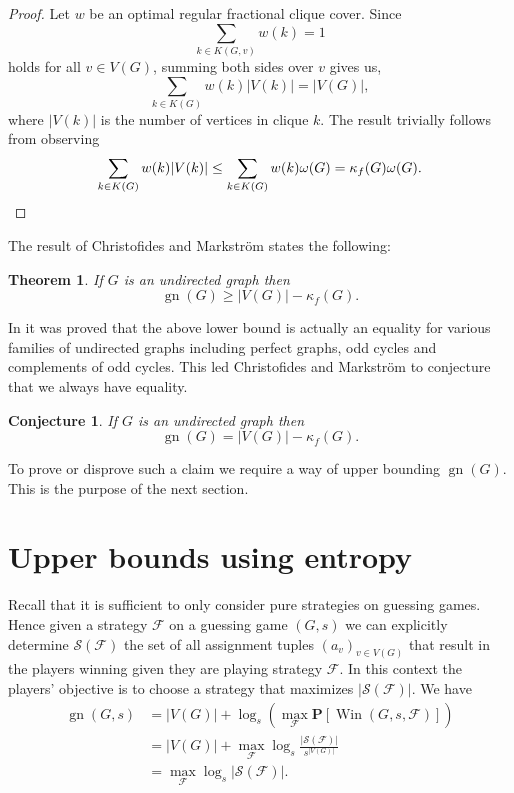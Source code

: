 \documentclass[a4paper, 14pt]{extarticle}
\theoremstyle{plain}
\newtheorem{theorem}[proposition]{Theorem}
\newtheorem{conjecture}[proposition]{Conjecture}
\def\mc{\mathcal}
\def\mb{\mathbf}
\DeclareMathOperator{\gn}{gn}
\DeclareMathOperator{\Win}{Win}
\begin{document}
\begin{proof}
Let $w$ be an optimal regular fractional clique cover. Since
\[\sum_{k\in K(G,v)} w(k) = 1\] 
holds for all $v\in V(G)$, summing
both sides over $v$ gives us,
\[
\sum_{k\in K(G)} w(k)|V(k)| = |V(G)|,
\]
where $|V(k)|$ is the number of vertices in clique $k$. The result
trivially follows from observing
\[
\sum_{k\in K(G)} w(k)|V(k)| \leq \sum_{k\in K(G)} w(k)\omega(G) =
\kappa_f(G) \omega(G). \qedhere
\]
\end{proof}

The result of Christofides and Markstr\"om \cite{Christofides&Markstrom11} states the following:

\begin{theorem}\label{Thm:LowerBoundIneq}
If $G$ is an undirected graph then
\[\gn(G)\geq |V(G)|-\kappa_f(G).\]
\end{theorem}

In \cite{Christofides&Markstrom11} it was proved that the above lower bound is actually an equality for various families of undirected graphs including perfect graphs, odd cycles and complements of odd cycles. This led Christofides and Markstr\"om \cite{Christofides&Markstrom11} to conjecture that we always have equality.

\begin{conjecture} \label{Conj:LowerBoundSharp}
If $G$ is an undirected graph then
\[\gn(G) = |V(G)|-\kappa_f(G).\]
\end{conjecture}


To prove or disprove such a claim we require a way of upper bounding $\gn(G)$. This is the purpose of the next section.

\section{Upper bounds using entropy} \label{Sec:Entropy}

Recall that it is sufficient to only consider pure strategies on
guessing games. Hence given a strategy $\mc{F}$ on a guessing game
$(G,s)$ we can explicitly determine $\mc{S}(\mc{F})$ the set of all
assignment tuples $(a_v)_{v\in V(G)}$ that result in the players
winning given they are playing strategy $\mc{F}$. In this context
the players' objective is to choose a strategy that maximizes
$|\mc{S}(\mc{F})|$. We have
\begin{align*}
\gn(G,s) &= |V(G)| + \log_s\left(\max_{\mc{F}}\mb{P}[\Win(G,s,\mc{F})]\right)\\
&= |V(G)| + \max_{\mc{F}}\log_s \frac{|\mc{S}(\mc{F})|}{s^{|V(G)|}} \\
&= \max_{\mc{F}}\log_s|\mc{S}(\mc{F})|.
\end{align*}
\end{document}
